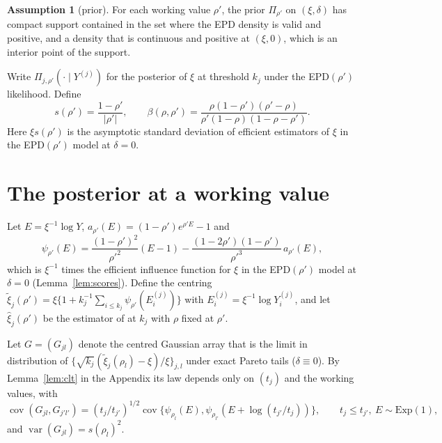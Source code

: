 \documentclass[11pt]{article}
\theoremstyle{definition}
\newtheorem{assumption}{Assumption}
\theoremstyle{remark}
\numberwithin{equation}{section}
\begin{document}
\begin{assumption}[prior]\label{ass:P}
For each working value $\rho'$, the prior $\Pi_{\rho'}$ on $(\xi,\delta)$ has compact support contained in the set where the EPD density is valid and positive, and a density that is continuous and positive at $(\xi,0)$, which is an interior point of the support.
\end{assumption}

Write $\Pi_{j,\rho'}(\cdot\mid Y^{(j)})$ for the posterior of $\xi$ at threshold $k_j$ under the EPD$(\rho')$ likelihood. Define
\begin{equation}\label{eq:s}
s(\rho')=\frac{1-\rho'}{|\rho'|},\qquad
\beta(\rho,\rho')=\frac{\rho(1-\rho')(\rho'-\rho)}{\rho'(1-\rho)(1-\rho-\rho')}.
\end{equation}
Here $\xi s(\rho')$ is the asymptotic standard deviation of efficient estimators of $\xi$ in the EPD$(\rho')$ model at $\delta=0$.

\section{The posterior at a working value}\label{sec:bvm}

Let $E=\xi^{-1}\log Y$, $a_{\rho'}(E)=(1-\rho')e^{\rho'E}-1$ and
\[
\psi_{\rho'}(E)=\frac{(1-\rho')^2}{\rho'^2}(E-1)-\frac{(1-2\rho')(1-\rho')}{\rho'^3}\,a_{\rho'}(E),
\]
which is $\xi^{-1}$ times the efficient influence function for $\xi$ in the EPD$(\rho')$ model at $\delta=0$ (Lemma~\ref{lem:scores}). Define the centring
$\tilde\xi_j(\rho')=\xi\{1+k_j^{-1}\sum_{i\le k_j}\psi_{\rho'}(E^{(j)}_i)\}$ with $E^{(j)}_i=\xi^{-1}\log Y^{(j)}_i$, and let $\hat\xi_j(\rho')$ be the estimator of \citet{bjs2009} at $k_j$ with $\rho$ fixed at $\rho'$.

Let $G=(G_{jl})$ denote the centred Gaussian array that is the limit in distribution of $\{\sqrt{k_j}(\tilde\xi_j(\rho_l)-\xi)/\xi\}_{j,l}$ under exact Pareto tails ($\delta\equiv0$). By Lemma~\ref{lem:clt} in the Appendix its law depends only on $(t_j)$ and the working values, with
\begin{equation}\label{eq:cov}
\operatorname{cov}(G_{jl},G_{j'l'})=(t_j/t_{j'})^{1/2}\operatorname{cov}\{\psi_{\rho_l}(E),\psi_{\rho_{l'}}(E+\log(t_{j'}/t_j))\},\qquad t_j\le t_{j'},\ E\sim\mathrm{Exp}(1),
\end{equation}
and $\operatorname{var}(G_{jl})=s(\rho_l)^2$.
\end{document}

